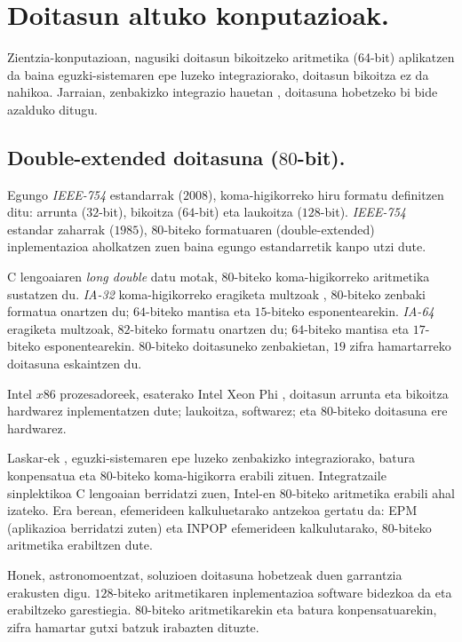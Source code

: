  
\section{Doitasun altuko konputazioak.}


Zientzia-konputazioan, nagusiki doitasun bikoitzeko aritmetika (64-bit) aplikatzen da baina eguzki-sistemaren epe luzeko integraziorako, doitasun bikoitza ez da nahikoa. Jarraian, zenbakizko integrazio hauetan \cite{Laskar2015}, doitasuna hobetzeko bi bide azalduko ditugu. 

\subsection*{Double-extended doitasuna ($80$-bit).}

Egungo \emph{IEEE-754} estandarrak ($2008$), koma-higikorreko hiru formatu definitzen ditu: arrunta ($32$-bit), bikoitza ($64$-bit) eta laukoitza ($128$-bit).  \emph{IEEE-754} estandar zaharrak ($1985$), $80$-biteko formatuaren (double-extended) inplementazioa aholkatzen zuen \cite{Overton2001} baina egungo estandarretik kanpo utzi dute.  

C lengoaiaren \emph{long double} datu motak, $80$-biteko koma-higikorreko aritmetika sustatzen du.  \emph{IA-32} koma-higikorreko eragiketa multzoak \cite{Muller2009}, $80$-biteko zenbaki formatua onartzen du; $64$-biteko mantisa eta $15$-biteko esponentearekin. \emph{IA-64} eragiketa multzoak, $82$-biteko formatu onartzen du; $64$-biteko mantisa eta $17$-biteko esponentearekin. $80$-biteko doitasuneko zenbakietan, $19$ zifra hamartarreko doitasuna eskaintzen du. 

Intel $x86$  prozesadoreek, esaterako Intel Xeon Phi \cite{IntelXeon2013}, doitasun arrunta eta bikoitza hardwarez inplementatzen dute; laukoitza, softwarez; eta $80$-biteko doitasuna ere hardwarez.

Laskar-ek \cite{Laskar2011,Laskar2015}, eguzki-sistemaren epe luzeko zenbakizko integraziorako, batura konpensatua eta $80$-biteko koma-higikorra erabili zituen. Integratzaile sinplektikoa C lengoaian berridatzi zuen, Intel-en $80$-biteko aritmetika erabili ahal izateko.
Era berean, efemerideen kalkuluetarako antzekoa gertatu da: EPM \cite{Pitjeva2014} (aplikazioa berridatzi zuten) eta INPOP \cite{Fienga2008} efemerideen kalkulutarako, $80$-biteko aritmetika erabiltzen dute.

Honek, astronomoentzat, soluzioen doitasuna hobetzeak duen garrantzia erakusten digu. $128$-biteko aritmetikaren inplementazioa software bidezkoa da eta erabiltzeko garestiegia. $80$-biteko aritmetikarekin eta batura konpensatuarekin, zifra hamartar gutxi batzuk irabazten dituzte. 
 
